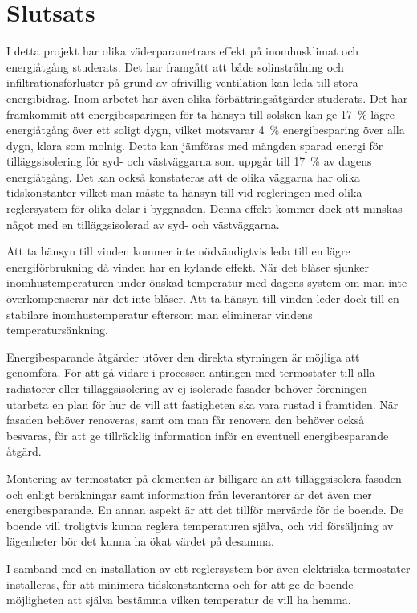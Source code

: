 \chapter{Slutsats}


I detta projekt har olika väderparametrars effekt på inomhusklimat och energiåtgång studerats.
Det har framgått att både solinstrålning och infiltrationsförluster på grund av ofrivillig
ventilation kan leda till stora energibidrag. Inom arbetet har även olika förbättringsåtgärder
studerats. Det har framkommit att energibesparingen för ta hänsyn till solsken kan ge 17~\% lägre energiåtgång över ett soligt dygn, vilket motsvarar 4~\% energibesparing över alla dygn, klara som molnig. Detta kan jämföras med mängden sparad energi för tilläggsisolering för syd- och västväggarna som uppgår till 17~\% av dagens energiåtgång. Det kan också konstateras att de olika väggarna har olika tidskonstanter vilket man måste ta hänsyn till vid regleringen med olika reglersystem för olika delar i byggnaden. Denna effekt kommer dock att minskas något med en tilläggsisolerad av syd- och västväggarna.

Att ta hänsyn till vinden kommer inte nödvändigtvis leda till en lägre energiförbrukning då vinden har en kylande effekt. När det blåser sjunker inomhustemperaturen under önskad temperatur med dagens system om man inte överkompenserar när det inte blåser. Att ta hänsyn till vinden leder dock till en stabilare inomhustemperatur eftersom man eliminerar vindens temperatursänkning.

Energibesparande åtgärder utöver den direkta styrningen är möjliga att genomföra. För att gå vidare i processen antingen med termostater till alla radiatorer eller tilläggsisolering av ej isolerade fasader behöver föreningen utarbeta en plan för hur de vill att fastigheten ska vara rustad i framtiden. När fasaden behöver renoveras, samt om man får renovera den behöver också besvaras, för att ge tillräcklig information inför en eventuell energibesparande åtgärd. 

Montering av termostater på elementen är billigare än att tilläggsisolera fasaden och enligt beräkningar samt information från leverantörer är det även mer energibesparande. En annan aspekt är att det tillför mervärde för de boende. De boende vill troligtvis kunna reglera temperaturen själva, och vid försäljning av lägenheter bör det kunna ha ökat värdet på desamma.

I samband med en installation av ett reglersystem bör även elektriska termostater installeras, för att minimera tidskonstanterna och för att ge de boende möjligheten att själva bestämma vilken temperatur de vill ha hemma.


